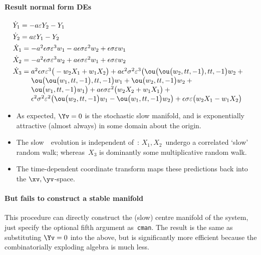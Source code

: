 \paragraph{Result normal form DEs}
\begin{align*}&
\dot Y_{1}=-a \eps Y_{2}-Y_{1}
\\&
\dot Y_{2}=a \eps Y_{1}-Y_{2}
\\&
\dot X_{1}=\ParMath{-a^{2} \epsilon  \sigma  \eps^{3} w_{1}-a \epsilon  \sigma  
\eps^{2} w_{2}+\epsilon  \sigma  \eps w_{1}
}
\\&
\dot X_{2}=\ParMath{-a^{2} \epsilon  \sigma  \eps^{3} w_{2}+a \epsilon  \sigma  
\eps^{2} w_{1}+\epsilon  \sigma  \eps w_{2}
}
\\&
\dot X_{3}=\ParMath{a^{2} \epsilon  \sigma  \eps^{3} \big(-w_{2} X_{1}+w_{1} X_{2
}\big)+a \epsilon ^{2} \sigma ^{2} \eps^{3} \big(\ou\big(\ou\big(w_{2},
tt,-1\big),tt,-1\big) w_{2}+\ou\big(\ou\big(w_{1},tt,-1\big),tt,-1\big) 
w_{1}+\ou\big(w_{2},tt,-1\big) w_{2}+\ou\big(w_{1},tt,-1\big) w_{1}\big)
+a \epsilon  \sigma  \eps^{2} \big(w_{2} X_{2}+w_{1} X_{1}\big)+
\epsilon ^{2} \sigma ^{2} \eps^{2} \big(\ou\big(w_{2},tt,-1\big) w_{1}-
\ou\big(w_{1},tt,-1\big) w_{2}\big)+\epsilon  \sigma  \eps \big(w_{2} X_
{1}-w_{1} X_{2}\big)
}
\end{align*}
\begin{itemize}
\item As expected, \(\Yv=0\) is the stochastic slow manifold, and is exponentially attractive (almost always) in some domain about the origin.
\item The slow~\Xv\ evolution is independent of~\Yv: \(X_1,X_2\)~undergo a correlated `slow' random walk; whereas~\(X_3\) is dominantly some multiplicative random walk.
\item The time-dependent coordinate transform maps these predictions back into the \(\xv,\yv\)-space.
\end{itemize}



\paragraph{But fails to construct a stable manifold}
This procedure can directly construct the (slow) centre manifold of the system, just specify the optional fifth argument as~\verb|cman|.  The result is the same as substituting \(\Yv=0\) into the above, but is significantly more efficient because the combinatorially exploding algebra is much less.  

